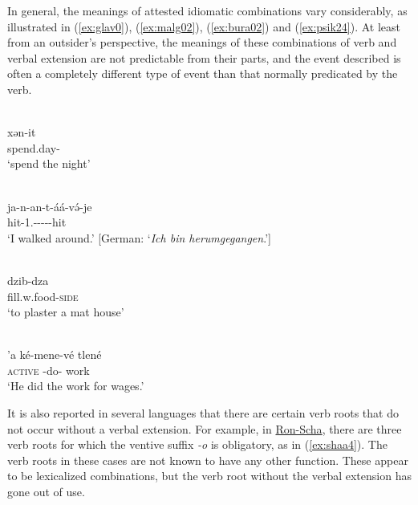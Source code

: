 In general, the meanings of attested idiomatic combinations vary considerably, as illustrated in (\ref{ex:glav0}), (\ref{ex:malg02}), (\ref{ex:bura02}) and (\ref{ex:psik24}). At least from an outsider's perspective, the meanings of these combinations of verb and verbal extension are not predictable from their parts, and the event described is often a completely different type of event than that normally predicated by the verb. 

\ea\label{ex:glav0}
 \\
\gll xən-it	\\
spend.day-		\\
\glt `spend the night'

\ex\label{ex:malg02}
 \\
\gll ja-n-an-t-áá-və́-je	\\
hit-1.-----hit	\\
\glt `I walked around.' [German: `\textit{Ich bin herumgegangen}.']

\ex\label{ex:bura02}
 \\
\gll dzib-dza	\\
fill.w.food-\textsc{side} \\
\glt `to plaster a mat house'

\ex\label{ex:psik24}
 \\
\gll  'a ké-mene-vé tlené	\\
\textsc{active} -do- work	\\
\glt `He did the work for wages.'
\z
 
It is also reported in several languages that there are certain verb roots that do not occur without a verbal extension. For example, in \hyperref[shaa]{Ron-Scha}, there are three verb roots for which the ventive suffix \textit{-o} is obligatory, as in (\ref{ex:shaa4}). The verb roots in these cases are not known to have any other function. These appear to be lexicalized combinations, but the verb root without the verbal extension has gone out of use. 
 
